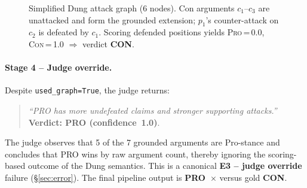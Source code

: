 \documentclass[11pt,twocolumn,letterpaper]{article}
\begin{document}
\begin{figure}[t]
\centering
{}
\caption{Simplified Dung attack graph (6 nodes). Con arguments $c_1$–$c_3$
are unattacked and form the grounded extension; $p_1$'s counter-attack on
$c_2$ is defeated by $c_1$. Scoring defended positions yields
\textsc{Pro}\,=\,0.0, \textsc{Con}\,=\,1.0 $\Rightarrow$ verdict \textbf{CON}.}
\label{fig:dung-simple}
\end{figure}

\paragraph{Stage 4 -- Judge override.}
Despite \texttt{used\_graph=True}, the judge returns:
\begin{quote}
\small\textit{``PRO has more undefeated claims and stronger supporting
attacks.''} \textbf{Verdict: PRO (confidence~1.0)}.
\end{quote}
The judge observes that 5 of the 7 grounded arguments are Pro-stance and
concludes that PRO wins by raw argument count, thereby ignoring the
scoring-based outcome of the Dung semantics.
This is a canonical \textbf{E3 -- judge override} failure
(\S\ref{sec:error}).
The final pipeline output is \textbf{PRO~$\times$} versus gold \textbf{CON}.
\end{document}

